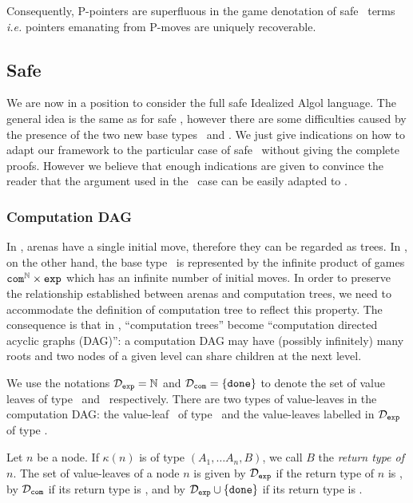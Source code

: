 Consequently, P-pointers are superfluous in the game denotation of safe \pcf\ terms {\it i.e.} pointers emanating from P-moves are uniquely recoverable.

\subsection{Safe \ialgol}

We are now in a position to consider the full safe Idealized Algol
language. The general idea is the same as for safe \pcf, however
there are some difficulties caused by the presence of the two new
base types \iavar\ and \iacom. We just give indications on how to
adapt our framework to the particular case of safe \ialgol\ without
giving the complete proofs. However we believe that enough
indications are given to convince the reader that the argument used
in the \pcf\ case can be easily adapted to \ialgol.

\subsubsection{Computation DAG}
In \pcf, arenas have a single initial move, therefore they can be
regarded as trees. In \ialgol, on the other hand, the base type
\iavar\ is represented by the infinite product of games
$\texttt{com}^{\mathbb{N}} \times \texttt{exp}$ which has an infinite number of
initial moves. In order to preserve the relationship established
between arenas and computation trees, we need to accommodate the
definition of computation tree to reflect this property. The
consequence is that in \ialgol, ``computation trees'' become
``computation directed acyclic graphs (DAG)'': a computation DAG may
have (possibly infinitely) many roots and two nodes of a given level
can share children at the next level.


We use the notations $\mathcal{D}_{\texttt{exp}} = \mathbb{N}$ and
$\mathcal{D}_{\texttt{com}} = \{ \texttt{done} \}$ to denote the set of value
leaves of type \iaexp\ and \iacom\ respectively. There are two types
of value-leaves in the computation DAG: the value-leaf \iadone\ of
type \iacom\ and the value-leaves labelled in $\mathcal{D}_{\texttt{exp}}$
of type \iaexp.

Let $n$ be a node. If $\kappa(n)$ is of type $(A_1,\ldots A_n,B)$,
we call $B$ the \emph{return type of $n$}. The set of value-leaves
of a node $n$ is given by $\mathcal{D}_{\texttt{exp}}$ if the return type
of $n$ is \iaexp, by $\mathcal{D}_{\texttt{com}}$ if its return type is
\iacom, and by $\mathcal{D}_{\texttt{exp}} \cup \{ \texttt{done} \}$ if its
return type is \iavar.


